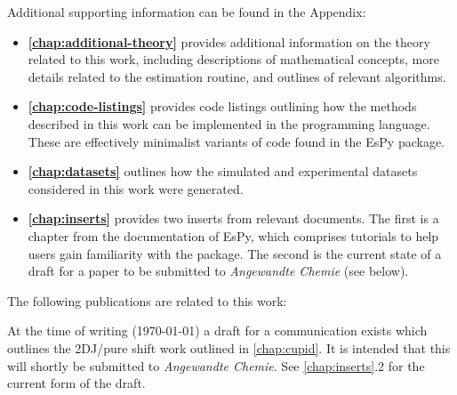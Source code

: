 Additional supporting information can be found in the Appendix:
\begin{itemize}
    \item \textbf{\cref{chap:additional-theory}} provides additional
        information on the theory related to this work, including descriptions
        of mathematical concepts, more details related to the estimation
        routine, and outlines of relevant algorithms.
    \item \textbf{\cref{chap:code-listings}} provides code listings outlining
        how the methods described in this work can be implemented in the
        \Python programming language.
        These are effectively minimalist variants of code found in the
        \ac{EsPy} package.
    \item \textbf{\cref{chap:datasets}} outlines how the simulated and
        experimental datasets considered in this work were generated.
    \item \textbf{\cref{chap:inserts}} provides two inserts from relevant
        documents. The first is a chapter from the documentation of \ac{EsPy},
        which comprises tutorials to help users gain familiarity with the
        package. The second is the current state of a draft for a paper to be
        submitted to \textit{Angewandte Chemie} (see below).
\end{itemize}

The following publications are related to this work:


At the time of writing (\today) a draft for a communication exists which
outlines the \ac{2DJ}/pure shift work outlined in \cref{chap:cupid}. It is
intended that this will shortly be submitted to \textit{Angewandte Chemie}.
See \cref{chap:inserts}.2 for the current form of the draft.
